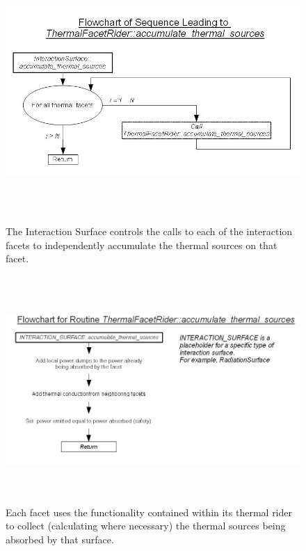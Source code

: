 \begin{figure}[htp]
\begin{center}
\includegraphics[height=3.9in]{figures/flow_chart_2.jpg}
\caption{The Interaction Surface controls the calls to each of the
interaction facets to independently accumulate the thermal sources on
that facet.}
\label{fig:thermalflowchart2}
\end{center}
\end{figure}

\begin{figure}[htp]
\begin{center}
\includegraphics[height=3.4in]{figures/flow_chart_tfr_ats.jpg}
\caption{Each facet uses the functionality contained within its
thermal rider to collect (calculating where necessary) the thermal
sources being absorbed by that surface.}
\label{fig:thermalflowchart3}
\end{center}
\end{figure}

